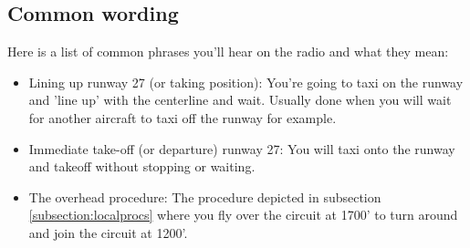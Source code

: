 \documentclass[12pt,letterpaper]{article}
\begin{document}
    \cbstart
    \subsection{Common wording}
    Here is a list of common phrases you'll hear on the radio and what they mean:
    \begin{itemize}
        \item Lining up runway 27 (or taking position): You're going to taxi on the runway and 'line up' with the centerline and wait. Usually done when you will wait for another aircraft to taxi off the runway for example.
        \item Immediate take-off (or departure) runway 27: You will taxi onto the runway and takeoff without stopping or waiting. 
        \item The overhead procedure: The procedure depicted in subsection \ref{subsection:localprocs} where you fly over the circuit at 1700' to turn around and join the circuit at 1200'.
    \end{itemize}
    \cbend
    
\newpage
\begin{versionhistory}
\end{versionhistory}
\end{document}
